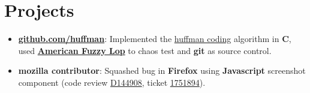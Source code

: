 \section{Projects}

\begin{itemize}[leftmargin=*]
    \item {
        \href{https://github.com/Haximilian/huffman}{\textbf{github.com/huffman}}: Implemented the \href{https://en.wikipedia.org/wiki/Huffman_coding}{huffman coding} algorithm in \textbf{C}, used \href{https://lcamtuf.coredump.cx/afl/}{\textbf{American Fuzzy Lop}} to chaos test and \textbf{git} as source control.
    }
    \item {
        \textbf{mozilla contributor}: Squashed bug in \textbf{Firefox} using \textbf{Javascript} screenshot component (code review \href{https://phabricator.services.mozilla.com/D144908}{D144908}, ticket \href{https://bugzilla.mozilla.org/show_bug.cgi?id=1751894}{1751894}).
    }
\end{itemize}